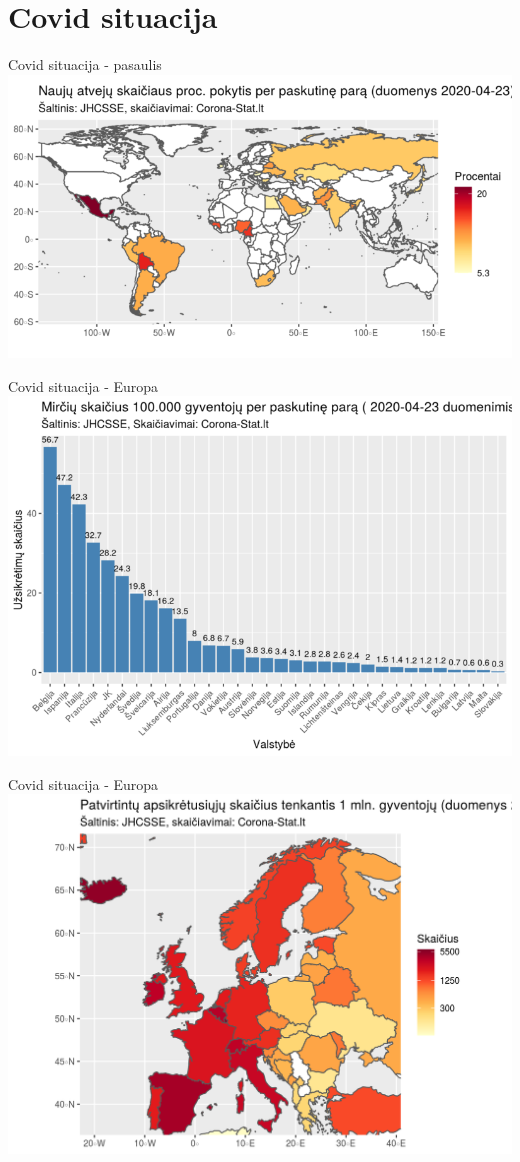 \documentclass[aspectratio=169, 11pt]{beamer}
\begin{document}
\section{Covid situacija}

\begin{frame}{Covid situacija - pasaulis}
\includegraphics[scale=0.5]{world.png}
\end{frame}

\begin{frame}{Covid situacija - Europa}
\centering
\includegraphics[scale=0.375]{mirtys_eu_pop.png}
\end{frame}

\begin{frame}{Covid situacija - Europa}
\centering
\includegraphics[scale=0.575]{eu_map.png}
\end{frame}
\end{document}
